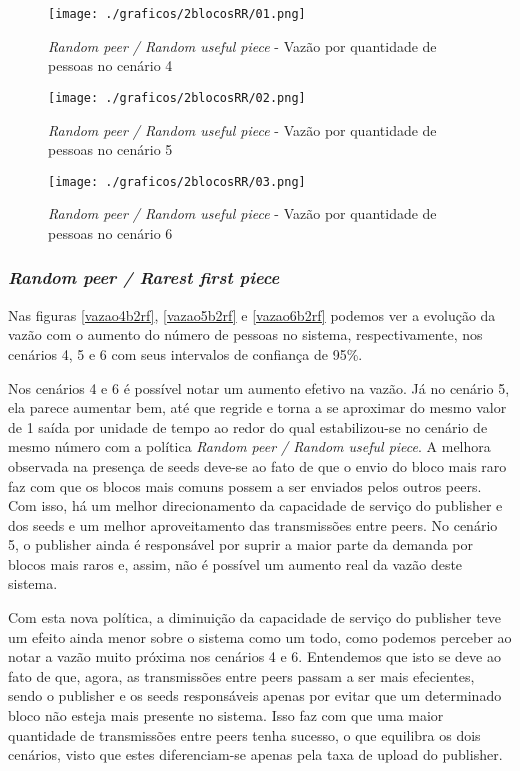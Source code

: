 \documentclass[a4paper,10pt]{article}
\begin{document}
\pagebreak

\begin{figure}
	\caption{\textit{Random peer / Random useful piece} - Vazão por quantidade de pessoas no cenário 4}
	\label{vazao4b2rr}
	\texttt{[image: ./graficos/2blocosRR/01.png]}
\end{figure}

\begin{figure}
	\caption{\textit{Random peer / Random useful piece} - Vazão por quantidade de pessoas no cenário 5}
	\label{vazao5b2rr}
	\texttt{[image: ./graficos/2blocosRR/02.png]}
\end{figure}

\clearpage
\pagebreak

\begin{figure}
	\caption{\textit{Random peer / Random useful piece} - Vazão por quantidade de pessoas no cenário 6}
	\label{vazao6b2rr}
	\texttt{[image: ./graficos/2blocosRR/03.png]}
\end{figure}

\pagebreak

\subsubsection{\textit{Random peer / Rarest first piece}}

Nas figuras \ref{vazao4b2rf}, \ref{vazao5b2rf} e \ref{vazao6b2rf} podemos ver a evolução da vazão com o aumento do número de pessoas no sistema, respectivamente, nos cenários 4, 5 e 6 com seus intervalos de confiança de 95\%.

Nos cenários 4 e 6 é possível notar um aumento efetivo na vazão. Já no cenário 5, ela parece aumentar bem, até que regride e torna a se aproximar do mesmo valor de 1 saída por unidade de tempo ao redor do qual estabilizou-se no cenário de mesmo número com a política \textit{Random peer / Random useful piece}. A melhora observada na presença de seeds deve-se ao fato de que o envio do bloco mais raro faz com que os blocos mais comuns possem a ser enviados pelos outros peers. Com isso, há um melhor direcionamento da capacidade de serviço do publisher e dos seeds e um melhor aproveitamento das transmissões entre peers. No cenário 5, o publisher ainda é responsável por suprir a maior parte da demanda por blocos mais raros e, assim, não é possível um aumento real da vazão deste sistema.

Com esta nova política, a diminuição da capacidade de serviço do publisher teve um efeito ainda menor sobre o sistema como um todo, como podemos perceber ao notar a vazão muito próxima nos cenários 4 e 6. Entendemos que isto se deve ao fato de que, agora, as transmissões entre peers passam a ser mais efecientes, sendo o publisher e os seeds responsáveis apenas por evitar que um determinado bloco não esteja mais presente no sistema. Isso faz com que uma maior quantidade de transmissões entre peers tenha sucesso, o que equilibra os dois cenários, visto que estes diferenciam-se apenas pela taxa de upload do publisher.
\end{document}
